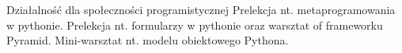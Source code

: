 \begin{rubric}{Działalność dla społeczności programistycznej}
\entry*[PyConPL 2011]Prelekcja nt. metaprogramowania w pythonie.
\entry*[PyConPL 2012]Prelekcja nt. formularzy w pythonie oraz warsztat of
frameworku Pyramid.
\entry*[4developers 2013]Mini-warsztat nt. modelu obiektowego Pythona.
\end{rubric}
